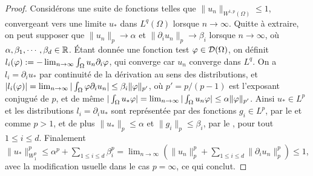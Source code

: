\begin{proof}
	Considérons une suite de fonctions telles que $\|u_n\|_{W^{1,p}(\Omega)} \leq 1$, convergeant vers une limite $u_*$ dans $L^q(\Omega)$ lorsque $n\to \infty$. Quitte à extraire, on peut supposer que $\|u_n\|_p \to \alpha$ et $\|\partial_i u_n\|_p \to \beta_i$ lorsque $n\to \infty$, où $\alpha, \beta_1,\cdots,\beta_d \in \mathbb{R}$.
	Étant donnée une fonction test $\varphi \in \mathcal{D}(\Omega)$, on définit $l_i(\varphi) := -\lim_{n\to \infty} \int_\Omega u_n \partial_i \varphi$, qui converge car $u_n$ converge dans $L^q$. On a $l_i = \partial_i u_*$ par continuité de la dérivation au sens des distributions, et $|l_i(\varphi)| = \lim_{n\to \infty} |\int_\Omega \varphi \partial_i u_n| \leq \beta_i \|\varphi\|_{p'}$, où $p'=p/(p-1)$ est l'exposant conjugué de $p$, et de même $|\int_\Omega u_* \varphi| = \lim_{n\to \infty} |\int_\Omega u_n \varphi| \leq \alpha \|\varphi\|_{p'}$. 
	Ainsi $u_*\in L^p$ et les distributions $l_i = \partial_i u_*$ sont représentée par des fonctions $g_i \in L^p$, par le  et comme $p>1$, et de plus $\|u_*\|_p \leq \alpha$ et $\|g_i\|_p \leq \beta_i$, par le , pour tout $1 \leq i \leq d$. Finalement $\|u_*\|^p_{W_1^p} \leq \alpha^p + \sum_{1 \leq i \leq d} \beta_i^p = \lim_{n\to \infty} (\|u_n\|_p^p + \sum_{1 \leq i \leq d} \|\partial_i u_n\|_p^p) \leq 1$, avec la modification usuelle dans le cas $p=\infty$, ce qui conclut. 	
%	
\end{proof}


